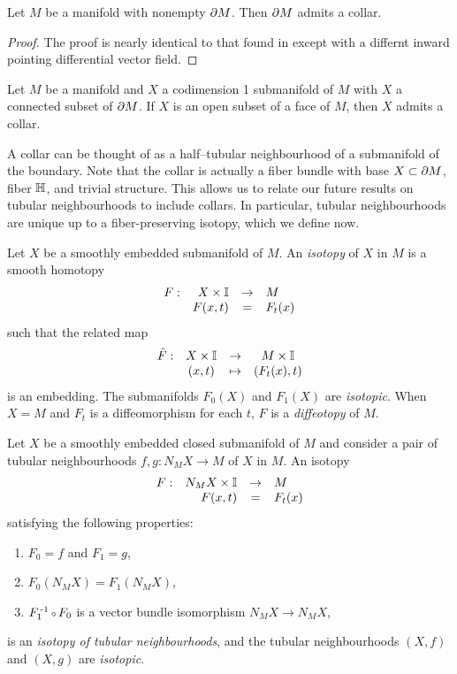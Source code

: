 \begin{prop}
	\label{prop:collar2}
	Let $M$ be a manifold with nonempty $\partial M$.
	Then $\partial M$ admits a collar.
\end{prop}

\begin{proof}
	The proof is nearly identical to that found in \cite{Kosi93} except with a differnt inward pointing differential vector field.
	
	
\end{proof}

\begin{prop}
	Let $M$ be a manifold and $X$ a codimension 1 submanifold of $M$ with $X$ a connected subset of $\partial M$.
	If $X$ is an open subset of a face of $M$, then $X$ admits a collar.
\end{prop}

A collar can be thought of as a half--tubular neighbourhood of a submanifold of the boundary.
Note that the collar is actually a fiber bundle with base $X\subset \partial M$, fiber $\mathbb{H}$, and trivial structure.
This allows us to relate our future results on tubular neighbourhoods to include collars.
In particular, tubular neighbourhoods are unique up to a fiber-preserving isotopy, which we define now.

\begin{defn}[Isotopy]
	\label{def:isotopy}
	Let $X$ be a smoothly embedded submanifold of $M$.
	An \emph{isotopy} of $X$ in $M$ is a smooth homotopy
	\[
		\begin{array}{crcl}
			F: & X\times \mathbb{I} & \to & M \\
			   & F(x,t) & = & F_t(x)
		\end{array}
	\]
	such that the related map
	\[
		\begin{array}{cccc}
			\hat{F}: & X\times\mathbb{I} & \to & M\times\mathbb{I} \\
					 & (x,t) & \mapsto & (F_t(x),t)
		\end{array}
	\]
	is an embedding.
	The submanifolds $F_0(X)$ and $F_1(X)$ are \emph{isotopic}.
	When $X=M$ and $F_t$ is a diffeomorphism for each $t$, $F$ is a \emph{diffeotopy} of $M$.
	
	Let $X$ be a smoothly embedded closed submanifold of $M$ and consider a pair of tubular neighbourhoods $f,g:N_M X\to M$ of $X$ in $M$.
	An isotopy
	\[
		\begin{array}{crcl}
			F: & N_M X\times\mathbb{I} & \to & M \\
			   & F(x,t) & = & F_t(x)
		\end{array}
	\]
	satisfying the following properties:
	\begin{enumerate}
		\item $F_0=f$ and $F_1=g$,
		\item $F_0(N_M X)=F_1(N_M X)$,
		\item $F_1\inv\comp F_0$ is a vector bundle isomorphism $N_M X\to N_M X$,
	\end{enumerate}
	 is an \emph{isotopy of tubular neighbourhoods}, and the tubular neighbourhoods $(X,f)$ and $(X,g)$ are \emph{isotopic}.
\end{defn}

